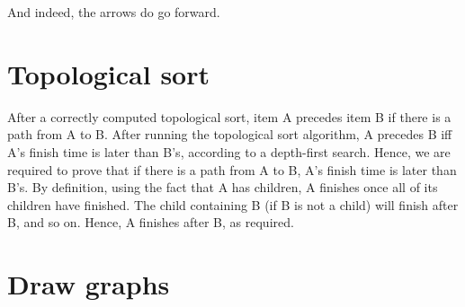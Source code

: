 \documentclass[11pt]{article}
\begin{document}
And indeed, the arrows do go forward.

\section{Topological sort}
After a correctly computed topological sort, item A precedes item B if there is a path from A to B. After running the topological sort algorithm, A precedes B iff A's finish time is later than B's, according to a depth-first search. Hence, we are required to prove that if there is a path from A to B, A's finish time is later than B's. By definition, using the fact that A has children, A finishes once all of its children have finished. The child containing B (if B is not a child) will finish after B, and so on. Hence, A finishes after B, as required.

\section{Draw graphs}
\end{document}
